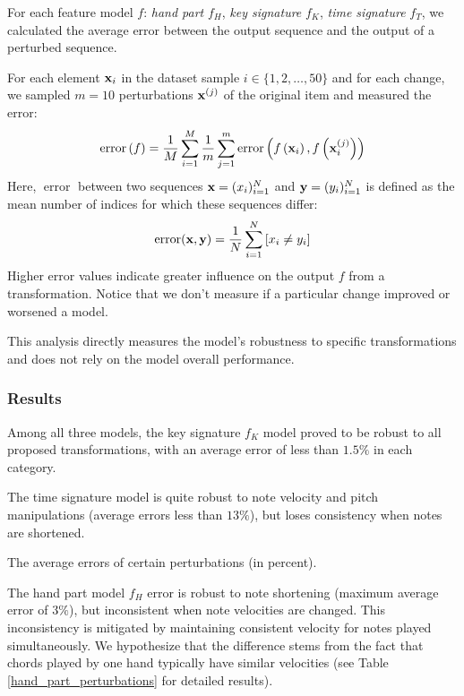 For each feature model $f$: \emph{hand part} $f_H$, \emph{key signature} $f_K$, \emph{time signature} $f_T$, we calculated the average error between the output sequence and the output of a perturbed sequence.

For each element ${\bf x}_i$ in the dataset sample $i\in\{1,2,\ldots,50\}$ and for each change, we sampled $m=10$ perturbations ${\bf x}^{(j)}$ of the original item and measured the error: \[\operatorname{error}\left(f\right) = \frac{1}{M}\sum_{i=1}^{M}\frac{1}{m}\sum_{j=1}^{m}\operatorname{error}\left(f\left({\bf x}_i\right), f\left({\bf x}_i^{(j)}\right)\right)\] Here, $\operatorname{error}$ between two sequences ${\bf x} = (x_i)_{i=1}^N$ and ${\bf y} = (y_i)_{i=1}^N$ is defined as the mean number of indices for which these sequences differ: \[\operatorname{error}({\bf x},{\bf y}) = \frac{1}{N}\sum_{i=1}^N \left[x_i \neq y_i\right]\] Higher error values indicate greater influence on the output $f$ from a transformation. Notice that we don't measure if a particular change improved or worsened a model.

This analysis directly measures the model's robustness to specific transformations and does not rely on the model overall performance.

\subsubsection{Results} \label{results}

Among all three models, the key signature $f_K$ model proved to be robust to all proposed transformations, with an average error of less than $1.5\%$ in each category.

The time signature model is quite robust to note velocity and pitch manipulations (average errors less than $13\%$), but loses consistency when notes are shortened. \begin{table}[ht!]

\caption{The average errors of certain perturbations (in percent).}
\label{perturbations}
\end{table}

The hand part model $f_H$ error is robust to note shortening (maximum average error of $3\%$), but inconsistent when note velocities are changed. This inconsistency is mitigated by maintaining consistent velocity for notes played simultaneously. We hypothesize that the difference stems from the fact that chords played by one hand typically have similar velocities (see Table \ref{hand_part_perturbations} for detailed results).

